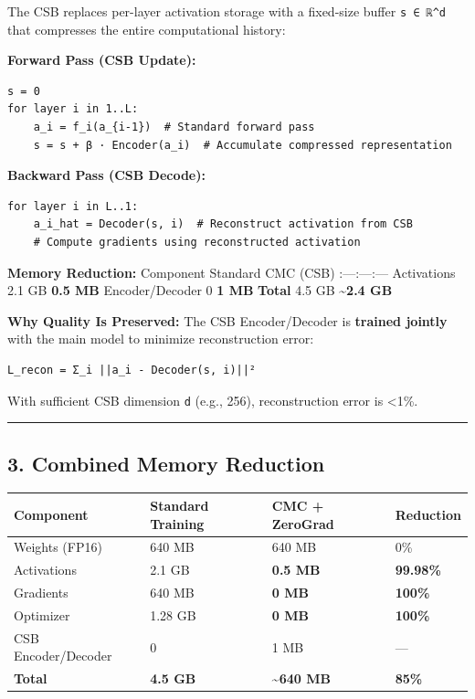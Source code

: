 \documentclass[
  11pt,
  a4paper,
]{article}
\begin{document}
The CSB replaces per-layer activation storage with a fixed-size buffer
\texttt{s\ ∈\ ℝ\^{}d} that compresses the entire computational history:

\textbf{Forward Pass (CSB Update):}

\begin{verbatim}
s = 0
for layer i in 1..L:
    a_i = f_i(a_{i-1})  # Standard forward pass
    s = s + β · Encoder(a_i)  # Accumulate compressed representation
\end{verbatim}

\textbf{Backward Pass (CSB Decode):}

\begin{verbatim}
for layer i in L..1:
    a_i_hat = Decoder(s, i)  # Reconstruct activation from CSB
    # Compute gradients using reconstructed activation
\end{verbatim}

\textbf{Memory Reduction:} \textbar{} Component \textbar{} Standard
\textbar{} CMC (CSB) \textbar{}
\textbar:---\textbar:---\textbar:---\textbar{} \textbar{} Activations
\textbar{} 2.1 GB \textbar{} \textbf{0.5 MB} \textbar{} \textbar{}
Encoder/Decoder \textbar{} 0 \textbar{} \textbf{1 MB} \textbar{}
\textbar{} \textbf{Total} \textbar{} 4.5 GB \textbar{}
\textbf{\textasciitilde2.4 GB} \textbar{}

\textbf{Why Quality Is Preserved:} The CSB Encoder/Decoder is
\textbf{trained jointly} with the main model to minimize reconstruction
error:

\begin{verbatim}
L_recon = Σ_i ||a_i - Decoder(s, i)||²
\end{verbatim}

With sufficient CSB dimension \texttt{d} (e.g., 256), reconstruction
error is \textless1\%.

\begin{center}\rule{0.5\linewidth}{0.5pt}\end{center}

\subsection{3. Combined Memory
Reduction}\label{combined-memory-reduction}

\begin{longtable}[]{@{}llll@{}}
\toprule\noalign{}
Component & Standard Training & CMC + ZeroGrad & Reduction \\
\midrule\noalign{}
\endhead
\bottomrule\noalign{}
\endlastfoot
Weights (FP16) & 640 MB & 640 MB & 0\% \\
Activations & 2.1 GB & \textbf{0.5 MB} & \textbf{99.98\%} \\
Gradients & 640 MB & \textbf{0 MB} & \textbf{100\%} \\
Optimizer & 1.28 GB & \textbf{0 MB} & \textbf{100\%} \\
CSB Encoder/Decoder & 0 & 1 MB & --- \\
\textbf{Total} & \textbf{4.5 GB} & \textbf{\textasciitilde640 MB} &
\textbf{85\%} \\
\end{longtable}
\end{document}
